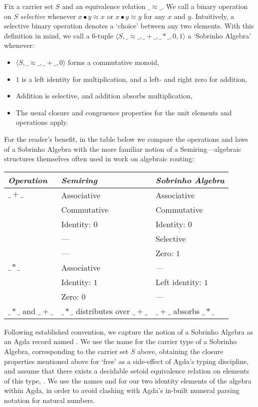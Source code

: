 Fix a carrier set $S$ and an equivalence relation $\_{≈}\_$.
We call a binary operation on $S$ \emph{selective} whenever $x \bullet y ≈ x$ or $x \bullet y ≈ y$ for any $x$ and $y$.
Intuitively, a selective binary operation denotes a `choice' between any two elements.
With this definition in mind, we call a 6-tuple $\langle S, \_{≈}\_, \_{+}\_, \_{*}\_, 0, 1 \rangle$ a `Sobrinho Algebra' whenever:
\begin{itemize}
\item
$\langle S, \_{≈}\_, \_{+}\_, 0 \rangle$ forms a commutative monoid,
\item
$1$ is a left identity for multiplication, and a left- and right zero for addition,
\item
Addition is selective, and addition absorbs multiplication,
\item
The usual closure and congruence properties for the unit elements and operations apply.
\end{itemize}

For the reader's benefit, in the table below we compare the operations and laws of a Sobrinho Algebra with the more familiar notion of a Semiring---algebraic structures themselves often used in work on algebraic routing:

\begin{center}
  \begin{tabular}{l||l@{\;\;\;}|l}
  \emph{Operation} & \emph{Semiring} & \emph{Sobrinho Algebra} \\
  \midrule
$\_{+}\_$ & Associative & Associative \\
                   & Commutative & Commutative \\
                   & Identity: $0$ & Identity: $0$ \\
                   & ---                      & Selective \\
                   & ---                      & Zero: $1$ \\
  \midrule
  $\_{*}\_$ & Associative & --- \\
                   & Identity: $1$ & Left identity: $1$ \\
                   & Zero: $0$     & --- \\
  \midrule
  $\_{*}\_$ and $\_{+}\_$ & $\_{*}\_$ distributes over $\_{+}\_$ &
                     $\_{+}\_$ absorbs $\_{*}\_$ \\
  \midrule
  \end{tabular}
\end{center}

Following established convention, we capture the notion of a Sobrinho Algebra as an Agda record named .
We use the name  for the carrier type of a Sobrinho Algebra, corresponding to the carrier set $S$ above, obtaining the closure properties mentioned above for `free' as a side-effect of Agda's typing discipline, and assume that there exists a decidable setoid equivalence relation on elements of this type, .
We use the names  and  for our two identity elements of the algebra within Agda, in order to avoid clashing with Agda's in-built numeral parsing notation for natural numbers.
